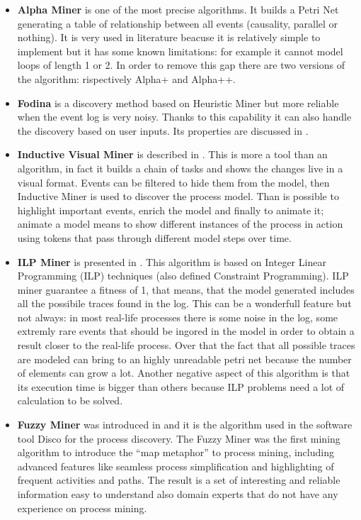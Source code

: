 \begin{itemize}
    \item \textbf{Alpha Miner} 
    is one of the most precise algorithms. It builds a Petri Net generating a table of relationship between all events 
    (causality, parallel or nothing). It is very used in literature beacuse it is relatively simple to implement but it has 
    some known limitations: for example it cannot model loops of length 1 or 2. In order to remove this gap there are two 
    versions of the algorithm: rispectively Alpha+ and Alpha++.
    
    \item \textbf{Fodina}
    is a discovery method based on Heuristic Miner but more reliable when the event log is very noisy. Thanks to this 
    capability it can also handle the discovery based on user inputs. Its properties are discussed in \cite{DBLP:journals/dss/Fodina}.
    
    \item \textbf{Inductive Visual Miner} is described in \cite{DBLP:conf/bpm/InductiveVisualMiner}.
    This is more a tool than an algorithm, in fact it builds a chain of tasks and shows the changes live in a visual 
    format. Events can be filtered to hide them from the model, then Inductive Miner is used to discover the process 
    model. Than is possible to highlight important events, enrich the model and finally to animate it; animate a model 
    means to show different instances of the process in action using tokens that pass through different model steps over 
    time.
    
    \item \textbf{ILP Miner} is presented in \cite{DBLP:journals/fuin/ILPMiner}.
    This algorithm is based on Integer Linear Programming (ILP) techniques (also defined Constraint Programming). ILP 
    miner guarantee a fitness of 1, that means, that the model generated includes all the possibile traces found in 
    the log. This can be a wonderfull feature but not always: in most real-life processes there is some noise in the log, 
    some extremly rare events that should be ingored in the model in order to obtain a result closer to the real-life 
    process. Over that the fact that all possible traces are modeled can bring to an highly unreadable petri net 
    because the number of elements can grow a lot.
    Another negative aspect of this algorithm is that its execution time is bigger than others because ILP problems need 
    a lot of calculation to be solved.
    
    \item \textbf{Fuzzy Miner} was introduced in \cite{DBLP:conf/bpm/DiscoFuzzyMiner} and it is the algorithm used in the software tool Disco 
    for the process discovery. The Fuzzy Miner was the first mining algorithm to introduce the “map metaphor” to process mining, 
    including advanced features like seamless process simplification and highlighting of frequent activities and paths. The 
    result is a set of interesting and reliable information easy to understand also domain experts that do not have any 
    experience on process mining.
    
\end{itemize}


